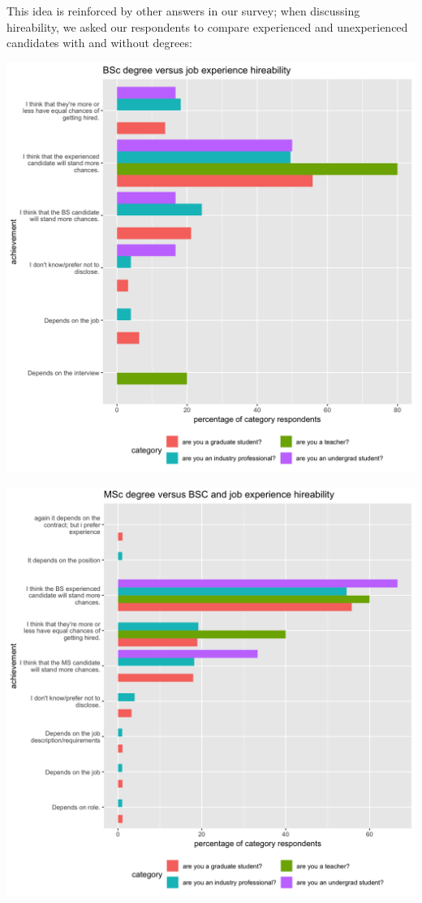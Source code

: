 \documentclass{sigchi}
\begin{document}
This idea is reinforced by other answers in our survey; when discussing hireability, we asked our respondents to compare experienced and unexperienced candidates with and without degrees:

\includegraphics[scale=0.2]{../data-analysis/plots_output/BSc_degree_versus_job_experience_hireability.png}

\includegraphics[scale=0.2]{../data-analysis/plots_output/MSc_degree_versus_BSC_and_job_experience_hireability.png}
\end{document}
